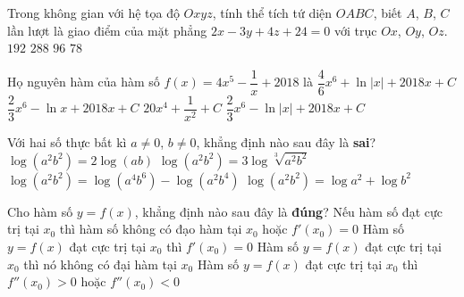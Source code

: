 \begin{ex}%
Trong không gian với hệ tọa độ $Oxyz$, tính thể tích tứ diện $OABC$, biết $A$, $B$, $C$ lần lượt là giao điểm của mặt phẳng $2x-3y+4z+24=0$ với trục $Ox$, $Oy$, $Oz$.
\choice
{$192$}
{$288$}
{\True $96$}
{$78$}
\end{ex}

\begin{ex}%
Họ nguyên hàm của hàm số $f(x)=4x^5-\dfrac{1}{x}+2018$ là
\choice
{$\dfrac{4}{6}x^6+\ln |x|+2018x+C$}
{$\dfrac{2}{3}x^6-\ln x+2018 x+C$}
{$20x^4+\dfrac{1}{x^2}+C$}
{\True $\dfrac{2}{3}x^6-\ln |x|+2018x+C$}
\end{ex}

\begin{ex}%
Với hai số thực bất kì $a\ne 0$, $b\ne 0$, khẳng định nào sau đây là \textbf{sai}?
\choice
{\True $\log\left( a^2b^2 \right)=2\log(ab)$}
{$\log\left( a^2b^2 \right)=3\log\sqrt[3]{a^2b^2}$}
{$\log\left( a^2b^2 \right)=\log\left( a^4b^6 \right)-\log\left( a^2b^4 \right)$}
{$\log\left( a^2b^2 \right)=\log a^2+\log b^2$}
\end{ex}

\begin{ex}%
Cho hàm số $y=f(x)$, khẳng định nào sau đây là \textbf{đúng}?
\choice
{\True Nếu hàm số đạt cực trị tại $x_0$ thì hàm số không có đạo hàm tại $x_0$ hoặc $f'(x_0)=0$}
{Hàm số $y=f(x)$ đạt cực trị tại $x_0$ thì $f'(x_0)=0$}
{Hàm số $y=f(x)$ đạt cực trị tại $x_0$ thì nó không có đại hàm tại $x_0$}
{Hàm số $y=f(x)$ đạt cực trị tại $x_0$ thì $f''(x_0)>0$ hoặc $f''(x_0)<0$}
\end{ex}

